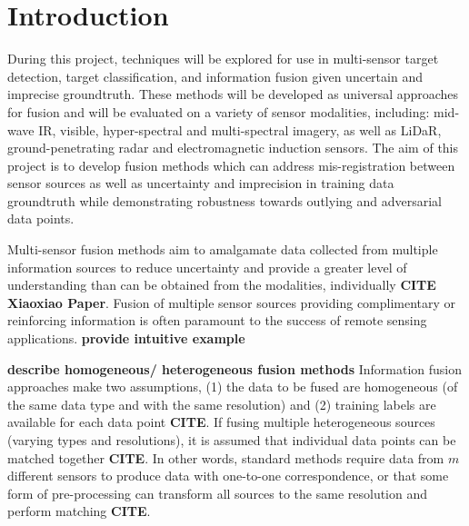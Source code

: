 \chapter{Introduction}

During this project, techniques will be explored for use in multi-sensor target detection, target classification, and information fusion given uncertain and imprecise groundtruth.  These methods will be developed as universal approaches for fusion and will be evaluated on a variety of sensor modalities, including: mid-wave IR, visible, hyper-spectral and multi-spectral imagery, as well as LiDaR, ground-penetrating radar and electromagnetic induction sensors.  The aim of this project is to develop fusion methods which can address mis-registration between sensor sources as well as uncertainty and imprecision in training data groundtruth while demonstrating robustness towards outlying and adversarial data points. \newline

Multi-sensor fusion methods aim to amalgamate data collected from multiple information sources to reduce uncertainty and provide a greater level of understanding than can be obtained from the modalities, individually \textbf{CITE Xiaoxiao Paper}.  Fusion of multiple sensor sources providing complimentary or reinforcing information is often paramount to the success of remote sensing applications.  \textbf{provide intuitive example} 

\textbf{describe homogeneous/ heterogeneous fusion methods}\newline
Information fusion approaches make two assumptions, (1) the data to be fused are homogeneous (of the same data type and with the same resolution) and (2) training labels are available for each data point \textbf{CITE}.  If fusing multiple heterogeneous sources (varying types and resolutions), it is assumed that individual data points can be matched together \textbf{CITE}.  In other words, standard methods require data from $m$ different sensors to produce data with one-to-one correspondence, or that some form of pre-processing can transform all sources to the same resolution and perform matching \textbf{CITE}.

